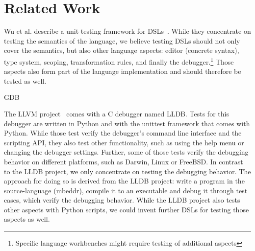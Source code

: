 \section{Related Work}

Wu et al. describe a unit testing framework for
\acp{DSL}~\cite{DBLP:conf/dsl/WuGM09}. 
While they concentrate on testing the semantics of the language, we believe testing
\acp{DSL} should not only cover the semantics, but also other language
aspects: editor (concrete syntax), type system, scoping, transformation rules,
and finally the debugger.\footnote{Specific language workbenches might require
testing of additional aspects} Those aspects also
form part of the language implementation and should therefore be tested as well.


\ac{GDB}

The \ac{LLVM} project~\cite{LLDB} comes with a C debugger named \ac{LLDB}.
Tests for this debugger are written in Python and with the 
unittest framework that comes with Python.
While those test verify the debugger's command
line interface and the scripting API, they also test other functionality, such
as using the help menu or changing the debugger settings.
Further, some of those tests
verify the debugging behavior on different platforms, such as Darwin, Linux or
FreeBSD.
In contrast to the \ac{LLDB} project, we only concentrate on testing
the debugging behavior. The approach for doing so is derived from the \ac{LLDB} 
project:
write a program in the source-language (mbeddr), compile it to an executable and
debug it through test cases, which verify the debugging behavior. While the 
\ac{LLDB} project also tests other aspects with Python scripts, we could invent
further \acp{DSL} for testing those aspects as well.
